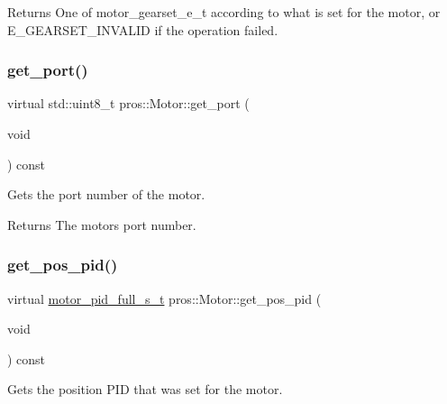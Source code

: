 \begin{DoxyReturn}{Returns}
One of motor\+\_\+gearset\+\_\+e\+\_\+t according to what is set for the motor, or E\+\_\+\+G\+E\+A\+R\+S\+E\+T\+\_\+\+I\+N\+V\+A\+L\+ID if the operation failed. 
\end{DoxyReturn}
\mbox{\label{classpros_1_1Motor_a5b0e644c8af396a6af8142b41d1bc7b6}} 
\subsubsection{\texorpdfstring{get\+\_\+port()}{get\_port()}}
{\footnotesize\ttfamily virtual std\+::uint8\+\_\+t pros\+::\+Motor\+::get\+\_\+port (\begin{DoxyParamCaption}\item[{void}]{ }\end{DoxyParamCaption}) const\hspace{0.3cm}{\ttfamily [virtual]}}



Gets the port number of the motor. 

\begin{DoxyReturn}{Returns}
The motor\textquotesingle{}s port number. 
\end{DoxyReturn}
\mbox{\label{classpros_1_1Motor_a32193b8d020ad1b47e1cb9f0b74a6c7d}} 
\subsubsection{\texorpdfstring{get\+\_\+pos\+\_\+pid()}{get\_pos\_pid()}}
{\footnotesize\ttfamily virtual \hyperlink{motors_8h_a0295cbf49f5c70c17b5fa962bd25febd}{motor\+\_\+pid\+\_\+full\+\_\+s\+\_\+t} pros\+::\+Motor\+::get\+\_\+pos\+\_\+pid (\begin{DoxyParamCaption}\item[{void}]{ }\end{DoxyParamCaption}) const\hspace{0.3cm}{\ttfamily [virtual]}}



Gets the position P\+ID that was set for the motor. 

